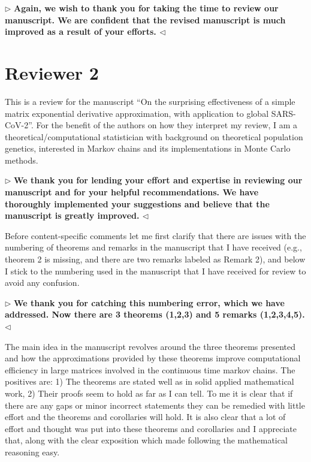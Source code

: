 \documentclass[12pt]{article}
\newenvironment{reply}{$\triangleright$\bfseries}{$\triangleleft$}
\begin{document}
\begin{reply}
	Again, we wish to thank you for taking the time to review our manuscript.  We are confident that the revised manuscript is much improved as a result of your efforts.
\end{reply}


\section*{Reviewer 2}

This is a review for the manuscript ``On the surprising effectiveness of a simple matrix exponential derivative approximation, with application to global SARS-CoV-2''. 
For the benefit of the authors on how they interpret my review, I am a theoretical/computational statistician with background on theoretical population genetics, interested in Markov chains and its implementations in Monte Carlo methods. 

\begin{reply}
	We thank you for lending your effort and expertise in reviewing our manuscript and for your helpful recommendations.  We have thoroughly implemented your suggestions and believe that the manuscript is greatly improved.  
\end{reply}

Before content-specific comments let me first clarify that there are issues with the numbering of theorems and remarks in the manuscript that I have received (e.g., theorem 2 is missing, and there are two remarks labeled as Remark 2), and below I stick to the numbering used in the manuscript that I have received for review to avoid any confusion. 

\begin{reply}
	We thank you for catching this numbering error, which we have addressed.  Now there are 3 theorems (1,2,3) and 5 remarks (1,2,3,4,5).
\end{reply}

The main idea in the manuscript revolves around the three theorems presented and how the approximations provided by these theorems improve computational efficiency in large matrices involved in the continuous time markov chains. The positives are: 1) The theorems are stated well as in solid applied mathematical work, 2) Their proofs seem to hold as far as I can tell. 
To me it is clear that if there are any gaps or minor incorrect statements they can be remedied with little effort and the theorems and corollaries will hold. It is also clear that a lot of effort and thought was put into these theorems and corollaries and I appreciate that, along with the clear exposition which made following the mathematical reasoning easy. 
\end{document}
